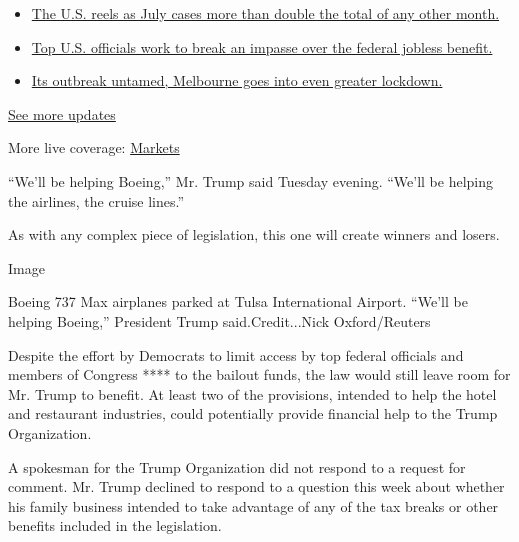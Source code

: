 \begin{itemize}
\tightlist
\item
  \href{https://www.nytimes.com/2020/08/01/world/coronavirus-covid-19.html?action=click\&pgtype=Article\&state=default\&region=MAIN_CONTENT_1\&context=storylines_live_updates\#link-34047410}{The
  U.S. reels as July cases more than double the total of any other
  month.}
\item
  \href{https://www.nytimes.com/2020/08/01/world/coronavirus-covid-19.html?action=click\&pgtype=Article\&state=default\&region=MAIN_CONTENT_1\&context=storylines_live_updates\#link-780ec966}{Top
  U.S. officials work to break an impasse over the federal jobless
  benefit.}
\item
  \href{https://www.nytimes.com/2020/08/01/world/coronavirus-covid-19.html?action=click\&pgtype=Article\&state=default\&region=MAIN_CONTENT_1\&context=storylines_live_updates\#link-2bc8948}{Its
  outbreak untamed, Melbourne goes into even greater lockdown.}
\end{itemize}

\href{https://www.nytimes.com/2020/08/01/world/coronavirus-covid-19.html?action=click\&pgtype=Article\&state=default\&region=MAIN_CONTENT_1\&context=storylines_live_updates}{See
more updates}

More live coverage:
\href{https://www.nytimes.com/live/2020/07/31/business/stock-market-today-coronavirus?action=click\&pgtype=Article\&state=default\&region=MAIN_CONTENT_1\&context=storylines_live_updates}{Markets}

``We'll be helping Boeing,'' Mr. Trump said Tuesday evening. ``We'll be
helping the airlines, the cruise lines.''

As with any complex piece of legislation, this one will create winners
and losers.

Image

Boeing 737 Max airplanes parked at Tulsa International Airport. ``We'll
be helping Boeing,'' President Trump said.Credit...Nick Oxford/Reuters

Despite the effort by Democrats to limit access by top federal officials
and members of Congress **** to the bailout funds, the law would still
leave room for Mr. Trump to benefit. At least two of the provisions,
intended to help the hotel and restaurant industries, could potentially
provide financial help to the Trump Organization.

A spokesman for the Trump Organization did not respond to a request for
comment. Mr. Trump declined to respond to a question this week about
whether his family business intended to take advantage of any of the tax
breaks or other benefits included in the legislation.

